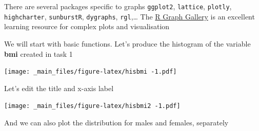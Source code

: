 \documentclass[
]{book}
\newenvironment{Shaded}{\begin{snugshade}}{\end{snugshade}}
\newcommand{\AttributeTok}[1]{\textcolor[rgb]{0.77,0.63,0.00}{#1}}
\newcommand{\FunctionTok}[1]{\textcolor[rgb]{0.00,0.00,0.00}{#1}}
\newcommand{\NormalTok}[1]{#1}
\newcommand{\SpecialCharTok}[1]{\textcolor[rgb]{0.00,0.00,0.00}{#1}}
\newcommand{\StringTok}[1]{\textcolor[rgb]{0.31,0.60,0.02}{#1}}
\begin{document}
There are several packages specific to graphs
\texttt{ggplot2}, \texttt{lattice}, \texttt{plotly}, \texttt{highcharter}, \texttt{sunburstR}, \texttt{dygraphs}, \texttt{rgl},\ldots{}
The \href{https://www.r-graph-gallery.com/index.html}{R Graph Gallery} is an excellent
learning resource for complex plots and visualisation

We will start with basic functions. Let's produce the histogram of the variable
\textbf{bmi} created in task 1

\begin{Shaded}
\end{Shaded}

\texttt{[image: \_main\_files/figure-latex/hisbmi -1.pdf]}

Let's edit the title and x-axis label

\begin{Shaded}
\end{Shaded}

\texttt{[image: \_main\_files/figure-latex/hisbmi2 -1.pdf]}

And we can also plot the distribution for males and females, separately
\end{document}
